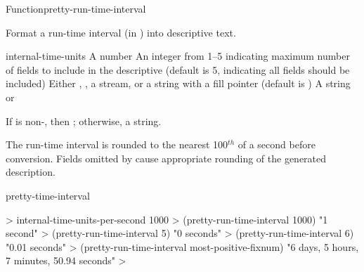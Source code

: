 \documentclass[10pt,twoside,english,pdftex]{article}
\begin{document}

\begin{functiondoc}{Function}{pretty-run-time-interval}{%
      
    \returns{} }
% 
% 

\fnsyntax

\fnpurpose Format a run-time interval (in )
into descriptive text.

\fnpackage {}

\fnmodule {}

\fnargs
\begin{args}{internal-time-units}
 A number
 An integer from 1--5 indicating maximum number of fields 
to include in the descriptive  (default is 5, indicating all 
fields should be included)
\arg[destination] Either \nil, , a stream, or a string with a fill 
pointer (default is \nil)
\arg[result] A string or \nil{}
\end{args}

\fnreturns If  is non-\nil, then \nil; otherwise, a string.

\fndescription The  run-time interval is rounded to
the nearest 100$^{th}$ of a second before conversion. Fields omitted by
 cause appropriate rounding of the generated
description.

\begin{alsos}{pretty-time-interval}
\end{alsos}

\fnexamples
%
\W\supp
\begin{example}
  > internal-time-units-per-second
  1000
  > (pretty-run-time-interval 1000)
  "1 second"
  > (pretty-run-time-interval 5)
  "0 seconds"
  > (pretty-run-time-interval 6)
  "0.01 seconds"
  > (pretty-run-time-interval most-positive-fixnum)
  "6 days, 5 hours, 7 minutes, 50.94 seconds"
  >
\end{example}

\end{functiondoc}

\end{document}
